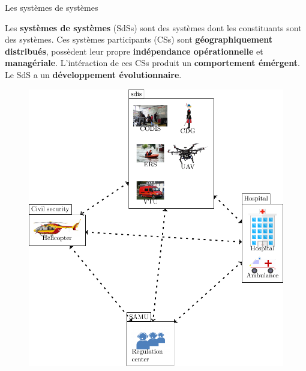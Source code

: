 

\begin{frame}{Les systèmes de systèmes}
\centering 
\begin{block}{}
Les \textbf{systèmes de systèmes} (SdSs) sont des systèmes dont les
constituants sont des systèmes. Ces systèmes participants (CSs) sont \textbf{géographiquement
distribués}, possèdent leur propre \textbf{indépendance
opérationnelle} et
\textbf{managériale}. 
L'intéraction de ces CSs produit un \textbf{comportement
émérgent}. Le
SdS a un \textbf{développement évolutionnaire}. 
\end{block}
\begin{figure}
\includegraphics[height=0.5\textwidth]{imgs/fig_sos_overview.pdf}
\end{figure}
\end{frame}

